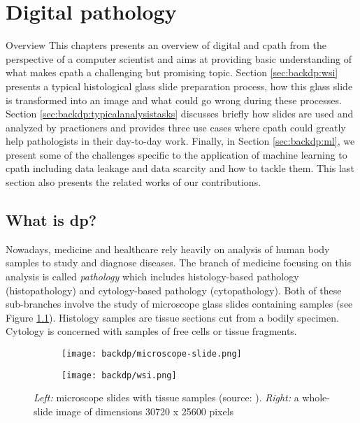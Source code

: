 \chapter{Digital pathology}
\label{chap:backdp}

\begin{overview}{Overview}
  This chapters presents an overview of digital and \acrlong{cpath} from the perspective of a computer scientist and aims at providing basic understanding of what makes \acrlong{cpath} a challenging but promising topic. Section \ref{sec:backdp:wsi} presents a typical histological glass slide preparation process, how this glass slide is transformed into an image and what could go wrong during these processes. Section \ref{sec:backdp:typicalanalysistasks} discusses briefly how slides are used and analyzed by practioners and provides three use cases where \acrlong{cpath} could greatly help pathologists in their day-to-day work. Finally, in Section \ref{sec:backdp:ml}, we present some of the challenges specific to the application of machine learning to \acrlong{cpath} including data leakage and data scarcity and how to tackle them. This last section also presents the related works of our contributions.
\end{overview}


\section{What is \acrlong{dp}?}
\label{sec:backdp:whatisdp}

Nowadays, medicine and healthcare rely heavily on analysis of human body samples to study and diagnose diseases. The branch of medicine focusing on this analysis is called \textit{pathology} which includes histology-based pathology (\aka histopathology) and cytology-based pathology (\aka cytopathology). Both of these sub-branches involve the study of microscope glass slides containing samples (see Figure \ref{fig:backdp:glassslides}). Histology samples are tissue sections cut from a bodily specimen. Cytology is concerned with samples of free cells or tissue fragments.

\begin{figure}
  \centering
  \begin{subfigure}[t]{0.48\textwidth}
    \centering
    \texttt{[image: backdp/microscope-slide.png]}
  \end{subfigure}
  \begin{subfigure}[t]{0.48\textwidth}
    \centering
    \texttt{[image: backdp/wsi.png]}
  \end{subfigure}
  \caption{\textit{Left:} microscope slides with tissue samples (source: \cite{img:glassslides}). \textit{Right:} a whole-slide image of dimensions 30720 x 25600 pixels}
  \label{fig:backdp:glassslides}
\end{figure}

